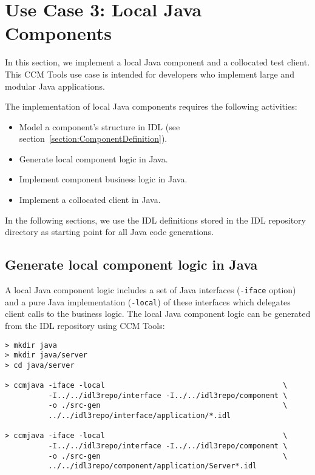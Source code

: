 \section{Use Case 3: Local Java Components}
\label{section:LocalJavaComponentImplementation}

In this section, we implement a local Java component and a collocated test
client.
This CCM Tools use case is intended for developers who implement large and
modular Java applications. 

\vspace{3mm}
The implementation of local Java components requires the following activities:
\begin{itemize}
	\item Model a component's structure in IDL 
			(see section~\ref{section:ComponentDefinition}). 
	\item Generate local component logic in Java.
	\item Implement component business logic in Java.
	\item Implement a collocated client in Java.
\end{itemize}

In the following sections, we use the IDL definitions stored in the IDL
repository directory as starting point for all Java code generations. 


\subsection{Generate local component logic in Java}
\label{subsection:GenerateJavaComponentLogic}

A local Java component logic includes a set of Java interfaces ({\tt -iface}
option) and a pure Java implementation ({\tt -local}) of these interfaces which
delegates client calls to the business logic. 
The local Java component logic can be generated from the IDL repository using
CCM Tools:
\begin{footnotesize}
\begin{verbatim}
> mkdir java
> mkdir java/server
> cd java/server
 
> ccmjava -iface -local                                         \
          -I../../idl3repo/interface -I../../idl3repo/component \ 
          -o ./src-gen                                          \
          ../../idl3repo/interface/application/*.idl

> ccmjava -iface -local                                         \
          -I../../idl3repo/interface -I../../idl3repo/component \
          -o ./src-gen                                          \
          ../../idl3repo/component/application/Server*.idl
\end{verbatim}
\end{footnotesize}

